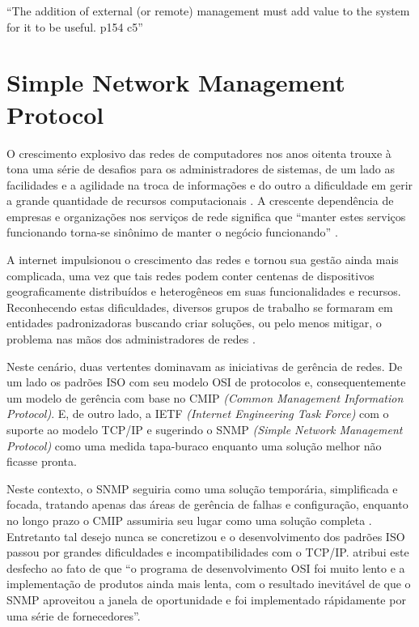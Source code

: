 \documentclass[twoside,english,brazilian]{UNISINOSmonografia}
\begin{document}
``The addition of external (or remote) management must add value to the system 
for it to be useful.
p154 c5'' \cite{perkins1997understanding}

\section{Simple Network Management Protocol}

O crescimento explosivo das redes de computadores nos anos oitenta trouxe à 
tona uma série de desafios para os administradores de sistemas, de um lado as 
facilidades e a agilidade na troca de informações e do outro a dificuldade em 
gerir a grande quantidade de recursos computacionais \cite{stallings1999snmp}. 
A crescente dependência de empresas e organizações nos serviços de rede 
significa que ``manter estes serviços funcionando torna-se sinônimo de manter 
o negócio funcionando''
\cite{Clemm2006}.

A internet impulsionou o crescimento das redes e tornou sua gestão ainda mais 
complicada, uma vez que tais redes podem conter centenas de dispositivos 
geograficamente distribuídos e heterogêneos em suas funcionalidades e recursos.
Reconhecendo estas dificuldades, diversos grupos de trabalho se formaram em 
entidades padronizadoras buscando criar soluções, ou pelo menos mitigar, o 
problema nas mãos dos administradores de redes
\cite{Leinwand1996}.

Neste cenário, duas vertentes dominavam as iniciativas de gerência de redes. 
De um lado os padrões ISO com seu modelo OSI de protocolos e, consequentemente 
um modelo de gerência com base no CMIP \textit{(Common Management Information 
Protocol)}.
E, de outro lado, a IETF \textit{(Internet Engineering Task Force)} com o 
suporte ao modelo TCP/IP e sugerindo o SNMP \textit{(Simple Network Management 
Protocol)} como uma medida tapa-buraco enquanto uma solução melhor não ficasse 
pronta.

Neste contexto, o SNMP seguiria como uma solução temporária, simplificada e 
focada, tratando apenas das áreas de gerência de falhas e configuração, 
enquanto no longo prazo o CMIP assumiria seu lugar como uma solução completa 
\cite{Leinwand1996,stallings1999snmp}. 
Entretanto tal desejo nunca se concretizou e o desenvolvimento dos padrões ISO 
passou por grandes dificuldades e incompatibilidades com o TCP/IP.
 atribui este desfecho ao fato de que ``o programa de 
desenvolvimento OSI foi muito lento e a implementação de produtos ainda mais 
lenta, com o resultado inevitável de que o SNMP aproveitou a janela de 
oportunidade e foi implementado rápidamente por uma série de fornecedores''.
\end{document}
